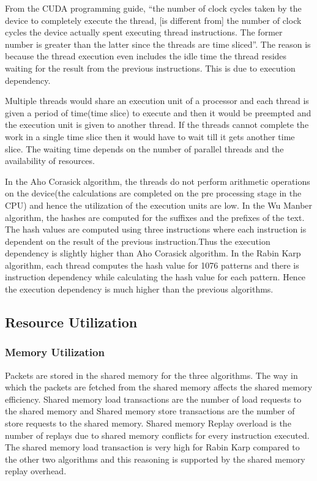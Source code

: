 From the CUDA programming guide, “the number of clock cycles taken by the device to completely execute the thread, [is different from] the number of clock cycles the device actually spent executing thread instructions. The former number is greater than the latter since the threads are time sliced”. The reason is because the thread execution even includes the idle time the thread resides waiting for the result from the previous instructions. This is due to execution dependency. 

Multiple threads would share an execution unit of a processor and each thread is given a period of time(time slice) to execute and then it would be preempted and the execution unit is given to another thread. If the threads cannot complete the work in a single time slice then it would have to wait till it gets another time slice. The waiting time depends on the number of parallel threads and the availability of resources. 

In the Aho Corasick algorithm, the threads do not perform arithmetic operations on the device(the calculations are completed on the pre processing stage in the CPU) and hence the utilization of the execution units are low. In the Wu Manber algorithm, the hashes are computed for the suffixes and the prefixes of the text. The hash values are computed using three instructions where each instruction is dependent on the result of the previous instruction.Thus the execution dependency is slightly higher than Aho Corasick algorithm. In the Rabin Karp algorithm, each thread computes the hash value for 1076 patterns and there is instruction dependency while calculating the hash value for each pattern. Hence the execution dependency is much higher than the previous algorithms.

\subsection{Resource Utilization}
\subsubsection{Memory Utilization}

Packets are stored in the shared memory for the three algorithms. The way in which the packets are fetched from the shared memory affects the shared memory efficiency. Shared memory load transactions are the number of load requests to the shared memory and Shared memory store transactions are the number of store requests to the shared memory. Shared memory Replay overload is the  number of replays due to shared memory conflicts for every instruction executed. The shared memory load transaction is very high for Rabin Karp compared to the other two algorithms and this reasoning is supported by the shared memory replay overhead. 

